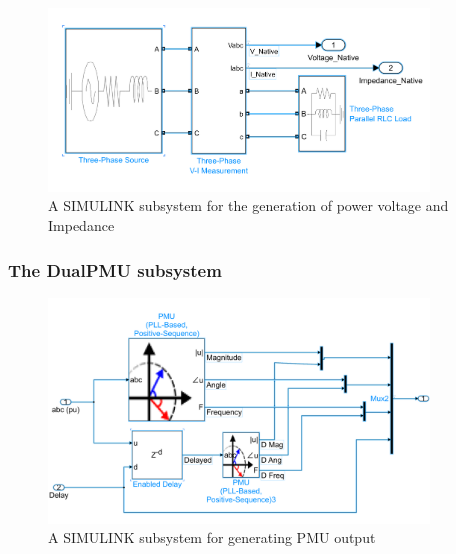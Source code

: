  \begin{figure}[ht]
\centering
\includegraphics[width=0.9\textwidth]{figures/PowerSourceSubsystem.png}
\caption[PowerSource SIMULINK subsystem]{A SIMULINK subsystem for the generation of power voltage and Impedance}

\end{figure}

\subsubsection{The DualPMU subsystem}

 \begin{figure}[ht]
\centering
\includegraphics[width=0.9\textwidth]{figures/DualPMUsubsystem.png}
\caption[DualPMU SIMULINK subsystem]{A SIMULINK subsystem for generating PMU output}

\end{figure}



